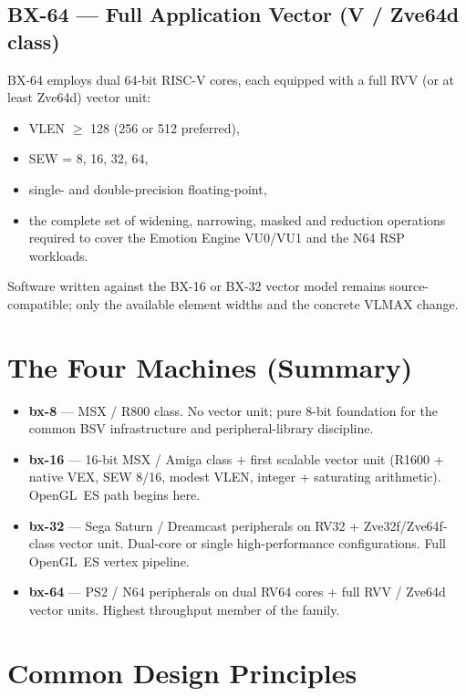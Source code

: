 \documentclass[11pt,a4paper]{article}
\begin{document}
\subsection{BX-64 --- Full Application Vector (V / Zve64d class)}

BX-64 employs dual 64-bit RISC-V cores, each equipped with a full RVV (or at least Zve64d) vector unit:
\begin{itemize}[leftmargin=1.5em]
  \item VLEN $\ge$ 128 (256 or 512 preferred),
  \item SEW = 8, 16, 32, 64,
  \item single- and double-precision floating-point,
  \item the complete set of widening, narrowing, masked and reduction operations required to cover the Emotion Engine VU0/VU1 and the N64 RSP workloads.
\end{itemize}
Software written against the BX-16 or BX-32 vector model remains source-compatible; only the available element widths and the concrete VLMAX change.

\section{The Four Machines (Summary)}

\begin{itemize}[leftmargin=1.5em]
  \item \textbf{bx-8} --- MSX / R800 class. No vector unit; pure 8-bit foundation for the common BSV infrastructure and peripheral-library discipline.
  \item \textbf{bx-16} --- 16-bit MSX / Amiga class + first scalable vector unit (R1600 + native VEX, SEW 8/16, modest VLEN, integer + saturating arithmetic). OpenGL~ES path begins here.
  \item \textbf{bx-32} --- Sega Saturn / Dreamcast peripherals on RV32 + Zve32f/Zve64f-class vector unit. Dual-core or single high-performance configurations. Full OpenGL~ES vertex pipeline.
  \item \textbf{bx-64} --- PS2 / N64 peripherals on dual RV64 cores + full RVV / Zve64d vector units. Highest throughput member of the family.
\end{itemize}

\section{Common Design Principles}
\end{document}
